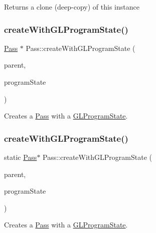 Returns a clone (deep-\/copy) of this instance \mbox{\label{classPass_a10060f69cfee6a75d115bd4e146fe419}} 
\subsubsection{\texorpdfstring{create\+With\+G\+L\+Program\+State()}{createWithGLProgramState()}\hspace{0.1cm}{\footnotesize\ttfamily [1/2]}}
{\footnotesize\ttfamily \hyperlink{classPass}{Pass} $\ast$ Pass\+::create\+With\+G\+L\+Program\+State (\begin{DoxyParamCaption}\item[{\hyperlink{classTechnique}{Technique} $\ast$}]{parent,  }\item[{\hyperlink{classGLProgramState}{G\+L\+Program\+State} $\ast$}]{program\+State }\end{DoxyParamCaption})\hspace{0.3cm}{\ttfamily [static]}}

Creates a \hyperlink{classPass}{Pass} with a \hyperlink{classGLProgramState}{G\+L\+Program\+State}. \mbox{\label{classPass_afaf117f6a07475c832d3fb9c036d2caf}} 
\subsubsection{\texorpdfstring{create\+With\+G\+L\+Program\+State()}{createWithGLProgramState()}\hspace{0.1cm}{\footnotesize\ttfamily [2/2]}}
{\footnotesize\ttfamily static \hyperlink{classPass}{Pass}$\ast$ Pass\+::create\+With\+G\+L\+Program\+State (\begin{DoxyParamCaption}\item[{\hyperlink{classTechnique}{Technique} $\ast$}]{parent,  }\item[{\hyperlink{classGLProgramState}{G\+L\+Program\+State} $\ast$}]{program\+State }\end{DoxyParamCaption})\hspace{0.3cm}{\ttfamily [static]}}

Creates a \hyperlink{classPass}{Pass} with a \hyperlink{classGLProgramState}{G\+L\+Program\+State}. \mbox{\label{classPass_aa052a30abf863d4e2f3af070cba3d9b2}} 
